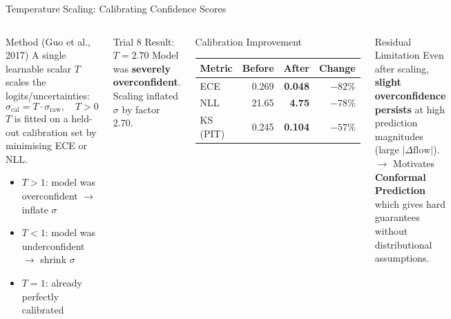 \documentclass[aspectratio=169,10pt]{beamer}
\newcommand{\emphred}[1]{\textcolor{tumred}{\textbf{#1}}}
\newcommand{\emphgreen}[1]{\textcolor{tumgreen}{\textbf{#1}}}
\begin{document}
\begin{frame}{Temperature Scaling: Calibrating Confidence Scores}
  \begin{columns}[c]
      \begin{block}{Method (Guo et al., 2017)}
        A single learnable scalar $T$ scales the logits/uncertainties:\\[0.3em]
        \[
          \sigma_{\text{cal}} = T \cdot \sigma_{\text{raw}}, \quad T > 0
        \]
        $T$ is fitted on a held-out calibration set by minimising ECE or NLL.
        \begin{itemize}
          \item $T > 1$: model was overconfident $\to$ inflate $\sigma$
          \item $T < 1$: model was underconfident $\to$ shrink $\sigma$
          \item $T = 1$: already perfectly calibrated
        \end{itemize}
      \end{block}
      \vspace{0.4em}
      \begin{alertblock}{Trial 8 Result: $T = 2.70$}
        Model was \emphred{severely overconfident}.\\
        Scaling inflated $\sigma$ by factor 2.70.
      \end{alertblock}
      \begin{exampleblock}{Calibration Improvement}
        \renewcommand{\arraystretch}{1.4}
        \begin{tabular}{lrrr}
          \toprule
          \textbf{Metric} & \textbf{Before} & \textbf{After} & \textbf{Change} \\
          \midrule
          ECE & 0.269 & \emphgreen{0.048} & $-82\%$ \\
          NLL & 21.65 & \emphgreen{4.75}  & $-78\%$ \\
          KS (PIT) & 0.245 & \emphgreen{0.104} & $-57\%$ \\
          \bottomrule
        \end{tabular}
      \end{exampleblock}
      \vspace{0.4em}
      \begin{block}{Residual Limitation}
        Even after scaling, \emphred{slight overconfidence persists} at high prediction magnitudes (large $|\Delta\text{flow}|$).\\[0.3em]
        $\to$ Motivates \textbf{Conformal Prediction} which gives hard guarantees without distributional assumptions.
      \end{block}
  \end{columns}
\end{frame}
\end{document}
